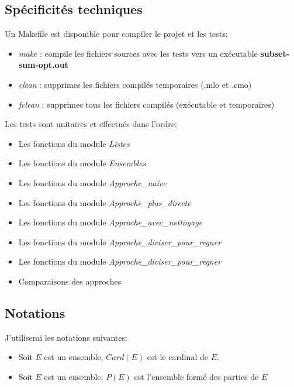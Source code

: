 \documentclass[10pt]{article}
\begin{document}
		\subsection*{Spécificités techniques}
			Un Makefile est disponible pour compiler le projet et les tests:
			\begin{itemize}[label=-]
				\setlength\itemsep{0.1em}
				\item \textit{make} : compile les fichiers sources avec les tests vers un exécutable \textbf{subset-sum-opt.out}
				\item \textit{clean} : supprimes les fichiers compilés temporaires (.mlo et .cmo)
				\item \textit{fclean} : supprimes tous les fichiers compilés (exécutable et temporaires)
			\end{itemize}
			Les tests sont unitaires et effectués dans l'ordre:
			\begin{itemize}[label=-]
				\item Les fonctions du module \textit{Listes}
				\item Les fonctions du module \textit{Ensembles}
				\item Les fonctions du module \textit{Approche\_naïve}
				\item Les fonctions du module \textit{Approche\_plus\_directe}
				\item Les fonctions du module \textit{Approche\_avec\_nettoyage}
				\item Les fonctions du module \textit{Approche\_diviser\_pour\_regner}
				\item Les fonctions du module \textit{Approche\_diviser\_pour\_regner}
				\item Comparaisons des approches
			\end{itemize}

		\subsection*{Notations}
			J'utiliserai les notations suivantes:
			\begin{itemize}[label=-]
				\setlength\itemsep{0.1em}
				\item Soit $E$ est un ensemble, $Card(E)$ est le cardinal de $E$.
				\item Soit $E$ est un ensemble, $P(E)$ est l'ensemble formé des parties de $E$
			\end{itemize}
\end{document}
